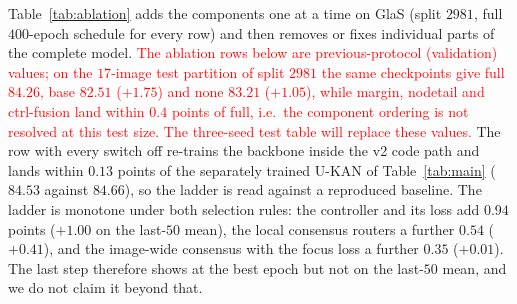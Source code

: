 

Table~\ref{tab:ablation} adds the components one at a time on GlaS (split $2981$, full $400$-epoch schedule for every row) and then removes or fixes individual parts of the complete model. \textcolor{red}{The ablation rows below are previous-protocol (validation) values; on the $17$-image test partition of split $2981$ the same checkpoints give full $84.26$, base $82.51$ ($+1.75$) and none $83.21$ ($+1.05$), while margin, nodetail and ctrl-fusion land within $0.4$ points of full, i.e.\ the component ordering is not resolved at this test size. The three-seed test table will replace these values.} The row with every switch off re-trains the backbone inside the v2 code path and lands within $0.13$ points of the separately trained U-KAN of Table~\ref{tab:main} ($84.53$ against $84.66$), so the ladder is read against a reproduced baseline. The ladder is monotone under both selection rules: the controller and its loss add $0.94$ points ($+1.00$ on the last-$50$ mean), the local consensus routers a further $0.54$ ($+0.41$), and the image-wide consensus with the focus loss a further $0.35$ ($+0.01$). The last step therefore shows at the best epoch but not on the last-$50$ mean, and we do not claim it beyond that.

